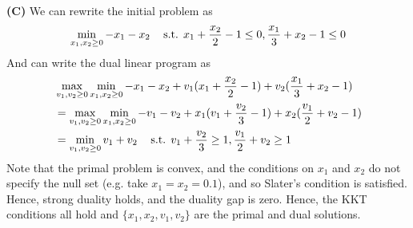 \documentclass{article}
\begin{document}
\textbf{(C)}
We can rewrite the initial problem as
\begin{align*}
    \min_{x_1,x_2 \geq 0} -x_1 - x_2 \hspace{3mm} \text{ s.t. } x_1 + \frac{x_2}{2} -1 \leq 0, 
    \frac{x_1}{3} + x_2 - 1 \leq 0
\end{align*}
And can write the dual linear program as 
\begin{align*}
    &\max_{v_1,v_2 \geq 0} \min_{x_1,x_2 \geq 0} -x_1 - x_2 + v_1(x_1 + \frac{x_2}{2} - 1) + 
    v_2(\frac{x_1}{3} + x_2 - 1)  \\
    &= \max_{v_1,v_2 \geq 0} \min_{x_1,x_2 \geq 0} -v_1 - v_2 + x_1(v_1 + \frac{v_2}{3} - 1) + 
        x_2(\frac{v_1}{2} + v_2 - 1)\\
    &= \min_{v_1,v_2 \geq 0} v_1 + v_2 \hspace{3mm} \text{ s.t. } v_1 + \frac{v_2}{3} \geq 1,
        \frac{v_1}{2} + v_2 \geq 1
\end{align*}
Note that the primal problem is convex, and the conditions on $x_1$ and $x_2$ do not specify the null set
(e.g. take $x_1 = x_2 = 0.1$), and so Slater's condition is satisfied. Hence, strong duality holds, and the
duality gap is zero. Hence, the KKT conditions all hold and $\{x_1,x_2,v_1,v_2\}$ are the primal and
dual solutions.
\end{document}
